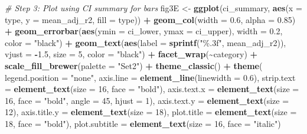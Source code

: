 \documentclass[
]{article}
\newenvironment{Shaded}{\begin{snugshade}}{\end{snugshade}}
\newcommand{\AttributeTok}[1]{\textcolor[rgb]{0.13,0.29,0.53}{#1}}
\newcommand{\CommentTok}[1]{\textcolor[rgb]{0.56,0.35,0.01}{\textit{#1}}}
\newcommand{\DecValTok}[1]{\textcolor[rgb]{0.00,0.00,0.81}{#1}}
\newcommand{\FloatTok}[1]{\textcolor[rgb]{0.00,0.00,0.81}{#1}}
\newcommand{\FunctionTok}[1]{\textcolor[rgb]{0.13,0.29,0.53}{\textbf{#1}}}
\newcommand{\NormalTok}[1]{#1}
\newcommand{\OtherTok}[1]{\textcolor[rgb]{0.56,0.35,0.01}{#1}}
\newcommand{\SpecialCharTok}[1]{\textcolor[rgb]{0.81,0.36,0.00}{\textbf{#1}}}
\newcommand{\StringTok}[1]{\textcolor[rgb]{0.31,0.60,0.02}{#1}}
\begin{document}
\begin{Shaded}
\begin{Highlighting}[]
\CommentTok{\# Step 3: Plot using CI summary for bars}
\NormalTok{fig3E }\OtherTok{\textless{}{-}} \FunctionTok{ggplot}\NormalTok{(ci\_summary, }\FunctionTok{aes}\NormalTok{(}\AttributeTok{x =}\NormalTok{ type, }\AttributeTok{y =}\NormalTok{ mean\_adj\_r2, }\AttributeTok{fill =}\NormalTok{ type)) }\SpecialCharTok{+}
  \FunctionTok{geom\_col}\NormalTok{(}\AttributeTok{width =} \FloatTok{0.6}\NormalTok{, }\AttributeTok{alpha =} \FloatTok{0.85}\NormalTok{) }\SpecialCharTok{+}
  \FunctionTok{geom\_errorbar}\NormalTok{(}\FunctionTok{aes}\NormalTok{(}\AttributeTok{ymin =}\NormalTok{ ci\_lower, }\AttributeTok{ymax =}\NormalTok{ ci\_upper), }\AttributeTok{width =} \FloatTok{0.2}\NormalTok{, }\AttributeTok{color =} \StringTok{"black"}\NormalTok{) }\SpecialCharTok{+}
  \FunctionTok{geom\_text}\NormalTok{(}\FunctionTok{aes}\NormalTok{(}\AttributeTok{label =} \FunctionTok{sprintf}\NormalTok{(}\StringTok{"\%.3f"}\NormalTok{, mean\_adj\_r2)), }\AttributeTok{vjust =} \SpecialCharTok{{-}}\FloatTok{1.5}\NormalTok{, }\AttributeTok{size =} \DecValTok{5}\NormalTok{, }\AttributeTok{color =} \StringTok{"black"}\NormalTok{) }\SpecialCharTok{+}
  \FunctionTok{facet\_wrap}\NormalTok{(}\SpecialCharTok{\textasciitilde{}}\NormalTok{category) }\SpecialCharTok{+}
  \FunctionTok{scale\_fill\_brewer}\NormalTok{(}\AttributeTok{palette =} \StringTok{"Set2"}\NormalTok{) }\SpecialCharTok{+}
  \FunctionTok{theme\_classic}\NormalTok{() }\SpecialCharTok{+}
  \FunctionTok{theme}\NormalTok{(}
    \AttributeTok{legend.position =} \StringTok{"none"}\NormalTok{,}
    \AttributeTok{axis.line =} \FunctionTok{element\_line}\NormalTok{(}\AttributeTok{linewidth =} \FloatTok{0.6}\NormalTok{),}
    \AttributeTok{strip.text =} \FunctionTok{element\_text}\NormalTok{(}\AttributeTok{size =} \DecValTok{16}\NormalTok{, }\AttributeTok{face =} \StringTok{"bold"}\NormalTok{),}
    \AttributeTok{axis.text.x =} \FunctionTok{element\_text}\NormalTok{(}\AttributeTok{size =} \DecValTok{16}\NormalTok{, }\AttributeTok{face =} \StringTok{"bold"}\NormalTok{, }\AttributeTok{angle =} \DecValTok{45}\NormalTok{, }\AttributeTok{hjust =} \DecValTok{1}\NormalTok{),}
    \AttributeTok{axis.text.y =} \FunctionTok{element\_text}\NormalTok{(}\AttributeTok{size =} \DecValTok{12}\NormalTok{),}
    \AttributeTok{axis.title.y =} \FunctionTok{element\_text}\NormalTok{(}\AttributeTok{size =} \DecValTok{18}\NormalTok{),}
    \AttributeTok{plot.title =} \FunctionTok{element\_text}\NormalTok{(}\AttributeTok{size =} \DecValTok{18}\NormalTok{, }\AttributeTok{face =} \StringTok{"bold"}\NormalTok{),}
    \AttributeTok{plot.subtitle =} \FunctionTok{element\_text}\NormalTok{(}\AttributeTok{size =} \DecValTok{16}\NormalTok{, }\AttributeTok{face =} \StringTok{"italic"}\NormalTok{)}

\end{Highlighting}
\end{Shaded}
\end{document}
